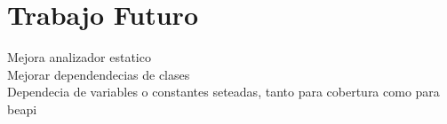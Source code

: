\chapter{Trabajo Futuro}
\label{cap:future}


Mejora analizador estatico
\\

Mejorar dependendecias de clases
\\

Dependecia de variables o constantes seteadas, tanto para cobertura como para beapi
